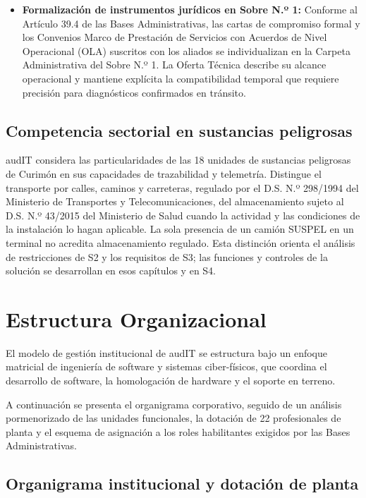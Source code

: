 \begin{itemize}
  \item \textbf{Formalización de instrumentos jurídicos en Sobre N.º 1:} Conforme al Artículo 39.4 de las Bases Administrativas, las cartas de compromiso formal y los Convenios Marco de Prestación de Servicios con Acuerdos de Nivel Operacional (OLA) suscritos con los aliados se individualizan en la Carpeta Administrativa del Sobre N.º 1. La Oferta Técnica describe su alcance operacional y mantiene explícita la compatibilidad temporal que requiere precisión para diagnósticos confirmados en tránsito.
\end{itemize}

\subsection{Competencia sectorial en sustancias peligrosas}\label{sec:1-suspel}

audIT considera las particularidades de las 18 unidades de sustancias peligrosas de Curimón en sus capacidades de trazabilidad y telemetría. Distingue el transporte por calles, caminos y carreteras, regulado por el D.S. N.º 298/1994 del Ministerio de Transportes y Telecomunicaciones, del almacenamiento sujeto al D.S. N.º 43/2015 del Ministerio de Salud cuando la actividad y las condiciones de la instalación lo hagan aplicable. La sola presencia de un camión SUSPEL en un terminal no acredita almacenamiento regulado. Esta distinción orienta el análisis de restricciones de S2 y los requisitos de S3; las funciones y controles de la solución se desarrollan en esos capítulos y en S4.

\section{Estructura Organizacional}\label{sec:1-organizacion}

El modelo de gestión institucional de audIT se estructura bajo un enfoque matricial de ingeniería de software y sistemas ciber-físicos, que coordina el desarrollo de software, la homologación de hardware y el soporte en terreno.

A continuación se presenta el organigrama corporativo, seguido de un análisis pormenorizado de las unidades funcionales, la dotación de 22 profesionales de planta y el esquema de asignación a los roles habilitantes exigidos por las Bases Administrativas.

\subsection{Organigrama institucional y dotación de planta}\label{sec:1-organigrama}

